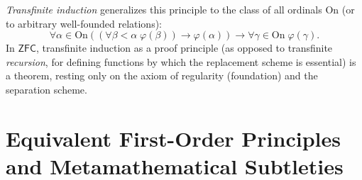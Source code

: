 \documentclass[12pt,a4paper]{article}
\theoremstyle{plain}
\theoremstyle{definition}
\newcommand{\ph}{\varphi}
\newcommand{\toinf}{\rightarrow}
\newcommand{\ZFC}{\textsf{ZFC}}
\begin{document}
\textit{Transfinite induction} generalizes this principle to the class of all ordinals $\text{On}$ (or to arbitrary well-founded relations):
\begin{equation}
    \forall \alpha \in \text{On} \left( (\forall \beta < \alpha \; \ph(\beta)) \toinf \ph(\alpha) \right) \toinf \forall \gamma \in \text{On} \; \ph(\gamma).
\end{equation}
In $\ZFC$, transfinite induction as a proof principle (as opposed to transfinite \emph{recursion}, for defining functions by which the replacement scheme is essential) is a theorem, resting only on the axiom of regularity (foundation) and the separation scheme.

\section{Equivalent First-Order Principles and Metamathematical Subtleties}
\end{document}
